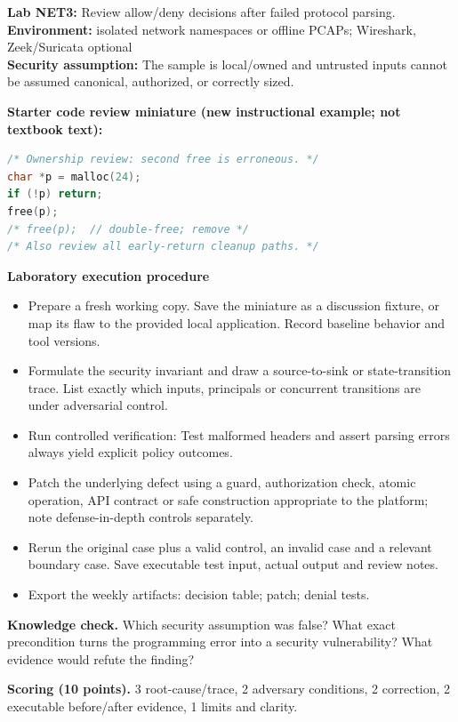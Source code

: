 \documentclass[10pt,letterpaper]{article}
\begin{document}
\begin{insight}\textbf{Lab NET3:} Review allow/deny decisions after failed protocol parsing.\\\textbf{Environment:} isolated network namespaces or offline PCAPs; Wireshark, Zeek/Suricata optional\\\textbf{Security assumption:} The sample is local/owned and untrusted inputs cannot be assumed canonical, authorized, or correctly sized.\end{insight}
\textbf{Starter code review miniature (new instructional example; not textbook text):}
\begin{lstlisting}[language=C]
/* Ownership review: second free is erroneous. */
char *p = malloc(24);
if (!p) return;
free(p);
/* free(p);  // double-free; remove */
/* Also review all early-return cleanup paths. */
\end{lstlisting}
\textbf{Laboratory execution procedure}
\begin{itemize}[leftmargin=*,itemsep=2pt]
\item Prepare a fresh working copy. Save the miniature as a discussion fixture, or map its flaw to the provided local application. Record baseline behavior and tool versions.
\item Formulate the security invariant and draw a source-to-sink or state-transition trace. List exactly which inputs, principals or concurrent transitions are under adversarial control.
\item Run controlled verification: Test malformed headers and assert parsing errors always yield explicit policy outcomes.
\item Patch the underlying defect using a guard, authorization check, atomic operation, API contract or safe construction appropriate to the platform; note defense-in-depth controls separately.
\item Rerun the original case plus a valid control, an invalid case and a relevant boundary case. Save executable test input, actual output and review notes.
\item Export the weekly artifacts: decision table; patch; denial tests.
\end{itemize}
\textbf{Knowledge check.} Which security assumption was false? What exact precondition turns the programming error into a security vulnerability? What evidence would refute the finding?

\textbf{Scoring (10 points).} 3 root-cause/trace, 2 adversary conditions, 2 correction, 2 executable before/after evidence, 1 limits and clarity.
\end{document}
